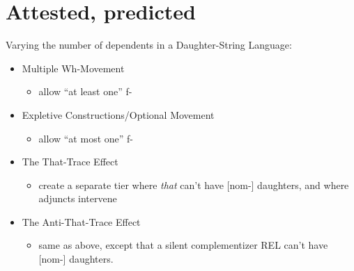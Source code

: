 
\begin{abstract}
\begin{enumerate}
  \item Analyzing movement as TSL-2 provides a unified analysis of a bunch of phenomena.
\end{enumerate}
\begin{quote}
A cognitive system that can handle basic TSL-2 movement must be able to also handle these phenomena.

\end{quote}
\begin{enumerate}[start=2]
  \item It also rules out a bunch of unattested phenomena.
  \item However, a lot of unattested phenomena are still predicted.
\end{enumerate}
\end{abstract}

\section*{Attested, predicted}

Varying the number of dependents in a Daughter-String Language:

\begin{itemize}
  \item Multiple Wh-Movement
  \begin{itemize}
    \item allow ``at least one'' f-
  \end{itemize}
  \item Expletive Constructions/Optional Movement
  \begin{itemize}
    \item allow ``at most one'' f-
  \end{itemize}
  \item The That-Trace Effect
  \begin{itemize}
    \item create a separate tier where \textit{that} can't have [nom-] daughters, and where adjuncts intervene
  \end{itemize}
  \item The Anti-That-Trace Effect
  \begin{itemize}
    \item same as above, except that a silent complementizer REL can't have [nom-] daughters.
  \end{itemize}
\end{itemize}

